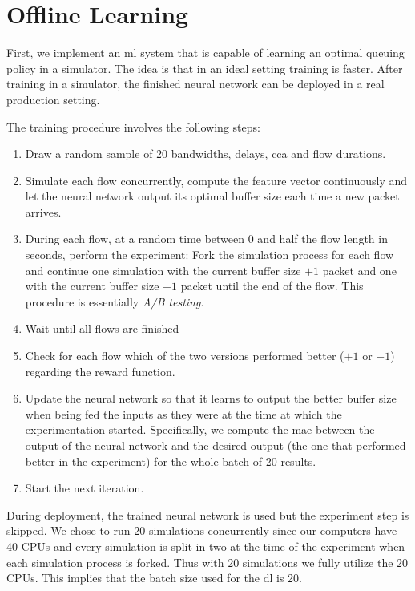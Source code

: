 \documentclass[conference]{IEEEtran}
\begin{document}
\section{Offline Learning}

First, we implement an \gls{ml} system that is capable of learning an optimal queuing policy in a simulator. The idea is that in an ideal setting training is faster. After training in a simulator, the finished neural network can be deployed in a real production setting. 

The training procedure involves the following steps:
\begin{enumerate}
\item Draw a random sample of 20 bandwidths, delays, \gls{cca} and flow durations.
\item Simulate each flow concurrently, compute the feature vector continuously and let the neural network output its optimal buffer size each time a new packet arrives. 
\item During each flow, at a random time between 0 and half the flow length in seconds, perform the experiment: Fork the simulation process for each flow and continue one simulation with the current buffer size $+1$ packet and one with the current buffer size $-1$ packet until the end of the flow. This procedure is essentially \textit{A/B testing}.  
\item Wait until all flows are finished
\item Check for each flow which of the two versions performed better ($+1$ or $-1$) regarding the reward function.
\item Update the neural network so that it learns to output the better buffer size when being fed the inputs as they were at the time at which the experimentation started. Specifically, we compute the \gls{mae} between the output of the neural network and the desired output (the one that performed better in the experiment) for the whole batch of 20 results.
\item Start the next iteration. 
\end{enumerate}

During deployment, the trained neural network is used but the experiment step is skipped. We chose to run 20 simulations concurrently since our computers have 40 CPUs and every simulation is split in two at the time of the experiment when each simulation process is forked. Thus with 20 simulations we fully utilize the 20 CPUs. This implies that the batch size used for the \gls{dl} is 20. 
\end{document}
